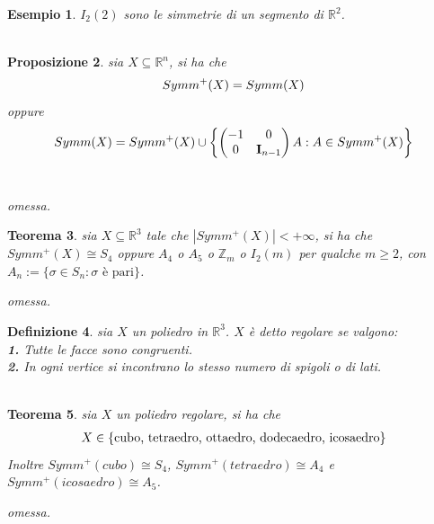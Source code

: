 \documentclass[oneside, 11pt]{amsbook}
\makeatletter
\newcommand{\0}{{(0)}}
\newcommand{\3}{{(3)}}
\theoremstyle{colonplain}
\newtheorem{thm}{Teorema}[chapter]
\newtheorem{prop}[thm]{Proposizione}
\theoremstyle{colondefinition}
\newtheorem{defn}[thm]{Definizione}
\newtheorem{ex}[thm]{Esempio}
\theoremstyle{colonremark}
\numberwithin{equation}{chapter}
\renewcommand{\proofname}{Dimostrazione}
\renewenvironment{proof}[1][\proofname]{\par
  \pushQED{\qed}%
  \normalfont \topsep6\p@\@plus6\p@\relax
  \trivlist
  \item[\hskip\labelsep\bfseries #1:]\ignorespaces
}{%
  \popQED\endtrivlist\@endpefalse
}
\makeatother
\begin{document}
\begin{ex} $I_2(2)$ sono le simmetrie di un segmento di $\mathbb{R}^2$. \\ \\
\end{ex}
\begin{prop} sia $X \subseteq \mathbb{R}^n$, si ha che
\begin{align}
    Symm^+(X) = Symm(X) \notag
\end{align}
oppure
\begin{align}
    Symm(X) = Symm^+(X) \cup \left\{ \begin{pmatrix}
        -1 & 0 \\
        0 & \mathbf{I}_{n - 1}
    \end{pmatrix} A : A \in Symm^+(X) \right\} \notag
\end{align} \\

\begin{proof} omessa. \end{proof}
\end{prop}
\begin{thm} sia $X \subseteq \mathbb{R}^3$ tale che $|Symm^+(X)| < +\infty$, si ha che $Symm^+(X) \cong S_4$ oppure $A_4$ o $A_5$ o $\mathbb{Z}_m$ o $I_2(m)$ per qualche $m \geq 2$, con $A_n := \{ \sigma \in S_n : \sigma \text{ è pari} \}$. \\

\begin{proof} omessa. \end{proof}
\end{thm}
\begin{defn} sia $X$ un poliedro in $\mathbb{R}^3$. $X$ è detto \textit{regolare} se valgono: \\
\textbf{1.} Tutte le facce sono congruenti. \\
\textbf{2.} In ogni vertice si incontrano lo stesso numero di spigoli o di lati. \\ \\
\end{defn}
\begin{thm} sia $X$ un poliedro regolare, si ha che
\begin{align}
    X \in \{ \text{cubo, tetraedro, ottaedro, dodecaedro, icosaedro} \} \notag
\end{align}
Inoltre $Symm^+(cubo) \cong S_4$, $Symm^+(tetraedro) \cong A_4$ e $Symm^+(icosaedro) \cong A_5$. \\

\begin{proof} omessa. \end{proof}
\end{thm}
\end{document}

